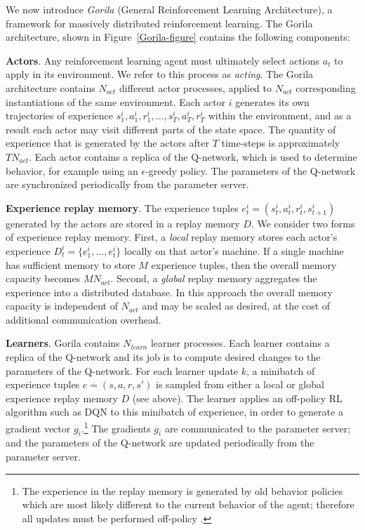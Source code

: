 \documentclass{article}
\begin{document}
We now introduce \emph{Gorila} (General Reinforcement Learning Architecture), a framework for massively distributed reinforcement learning. The Gorila architecture, shown in Figure~\ref{Gorila-figure} contains the following components:

{\bf Actors}. Any reinforcement learning agent must ultimately select actions $a_t$ to apply in its environment. We refer to this process as \emph{acting}. The Gorila architecture contains $N_{act}$ different actor processes, applied to $N_{act}$ corresponding instantiations of the same environment. Each actor $i$ generates its own trajectories of experience $s^i_1, a^i_1, r^i_1, ..., s^i_T, a^i_T, r^i_T$ within the environment, and as a result each actor may visit different parts of the state space. The quantity of experience that is generated by the actors after $T$ time-steps is approximately $TN_{act}$. Each actor contains a replica of the Q-network, which is used to determine behavior, for example using an $\epsilon$-greedy policy. The parameters of the Q-network are synchronized periodically from the parameter server.

{\bf Experience replay memory}. The experience tuples $e^i_t = (s^i_t, a^i_t, r^i_t, s^i_{t+1})$ generated by the actors are stored in a replay memory $D$. We consider two forms of experience replay memory. First, a \emph{local} replay memory stores each actor's experience $D^i_t =  \{ e^i_1, ..., e^i_t \}$ locally on that actor's machine. If a single machine has sufficient memory to store $M$ experience tuples, then the overall memory capacity becomes $MN_{act}$. Second, a \emph{global} replay memory aggregates the experience into a distributed database. In this approach the overall memory capacity is independent of $N_{act}$ and may be scaled as desired, at the cost of additional communication overhead.

{\bf Learners}. Gorila contains $N_{learn}$ learner processes. Each learner contains a replica of the Q-network and its job is to compute desired changes to the parameters of the Q-network. For each learner update $k$, a minibatch of experience tuples $e = (s,a,r,s')$ is sampled from either a local or global experience replay memory $D$ (see above). The learner applies an off-policy RL algorithm such as DQN \cite{mnih2013atari} to this minibatch of experience, in order to generate a gradient vector $g_i$.\footnote{The experience in the replay memory is generated by old behavior policies which are most likely different to the current behavior of the agent; therefore all updates must be performed off-policy \cite{sutton:book}.} The gradients $g_i$ are communicated to the parameter server; and the parameters of the Q-network are updated periodically from the parameter server. 
\end{document}
